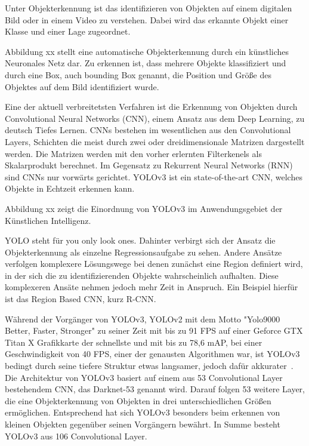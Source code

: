 Unter Objekterkennung ist das identifizieren von Objekten auf einem digitalen Bild oder in einem Video zu verstehen. Dabei wird das erkannte Objekt einer Klasse und einer Lage zugeordnet. 

Abbildung xx stellt eine automatische Objekterkennung durch ein künstliches Neuronales Netz dar. Zu erkennen ist, dass mehrere Objekte klassifiziert und durch eine Box, auch bounding Box genannt, die Position und Größe des Objektes auf dem Bild identifiziert wurde. 

Eine der aktuell verbreitetsten Verfahren ist die Erkennung von Objekten durch Convolutional Neural Networks (CNN), einem Ansatz aus dem Deep Learning, zu deutsch Tiefes Lernen. CNNs bestehen im wesentlichen aus den Convolutional Layers, Schichten die meist durch zwei oder dreidimensionale Matrizen dargestellt werden. Die Matrizen werden mit den vorher erlernten Filterkenels als Skalarprodukt berechnet. Im Gegensatz zu Rekurrent Neural Networks (RNN) sind CNNs nur vorwärts gerichtet. YOLOv3 ist ein state-of-the-art CNN, welches Objekte in Echtzeit erkennen kann.  




Abbildung xx zeigt die Einordnung von YOLOv3 im Anwendungsgebiet der Künstlichen Intelligenz. 


YOLO steht für you only look ones. Dahinter verbirgt sich der Ansatz die Objekterkennung als einzelne Regressionsaufgabe zu sehen. Andere Ansätze verfolgen komplexere Lösungswege bei denen zunächst eine Region definiert wird, in der sich die zu identifizierenden Objekte wahrscheinlich aufhalten. Diese komplexeren Ansäte nehmen jedoch mehr Zeit in Anspruch. Ein Beispiel hierfür ist das Region Based CNN, kurz R-CNN. 

Während der Vorgänger von YOLOv3, YOLOv2 mit dem Motto "Yolo9000 Better, Faster, Stronger" zu seiner Zeit mit bis zu 91 FPS auf einer Geforce GTX Titan X Grafikkarte der schnellste und mit bis zu 78,6 mAP, bei einer Geschwindigkeit von 40 FPS, einer der genausten Algorithmen war, ist YOLOv3 bedingt durch seine tiefere Struktur etwas langsamer, jedoch dafür akkurater~\cite{redmon2017yolo9000}. Die Architektur von YOLOv3 basiert auf einem aus 53 Convolutional Layer bestehendem CNN, das Darknet-53 genannt wird. 
Darauf folgen 53 weitere Layer, die eine Objekterkennung von Objekten in drei unterschiedlichen Größen ermöglichen. Entsprechend hat sich YOLOv3 besonders beim erkennen von kleinen Objekten gegenüber seinen Vorgängern bewährt. In Summe besteht YOLOv3 aus 106 Convolutional Layer.


